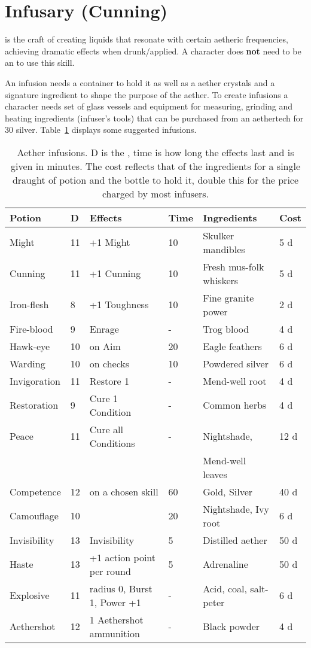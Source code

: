 \documentclass[a4paper,11pt,oneside]{book}
\newcommand{\textlf}[1]{\textbf{\titlecap{#1}}}
\begin{document}
\section{Infusary (Cunning)}
\label{sec:infuse}
\textlf{Infusary} is the craft of creating liquids that resonate with certain aetheric frequencies, achieving dramatic effects when drunk/applied. A character does \textbf{not} need to be an \textlf{aethermancer} to use this skill.

An infusion needs a container to hold it as well as a aether crystals and a signature ingredient to shape the purpose of the aether. To create infusions a character needs set of glass vessels and equipment for measuring, grinding and heating ingredients (infuser's tools) that can be purchased from an aethertech for 30 silver.
Table~\ref{tab:alch} displays some suggested infusions.

\begin{table}[ht!]
\caption{Aether infusions. D is the \textlf{difficulty}, time is how long the effects last and is given in minutes. The cost reflects that of the ingredients for a single draught of potion and the bottle to hold it, double this for the price charged by most infusers.}
\begin{tabular}{|l|l|l|l|l|l|}
\hline
Potion & D & Effects & Time & Ingredients & Cost \\
\hline
Might &  11 & +1 Might & 10 & Skulker mandibles & 5 d \\
Cunning & 11 & +1 Cunning & 10 & Fresh mus-folk whiskers & 5 d \\
Iron-flesh & 8 & +1 Toughness & 10 & Fine granite power & 2 d \\
Fire-blood & 9 & Enrage & - & Trog blood & 4 d \\
Hawk-eye & 10 & \textlf{edge+} on Aim & 20 & Eagle feathers & 6 d \\
Warding & 10 & \textlf{edge+} on \textlf{resist} checks & 10 & Powdered silver & 6 d \\ 
Invigoration & 11 & Restore 1 \textlf{endurance} & - & Mend-well root & 4 d \\
Restoration & 9 & Cure 1 Condition & - & Common herbs & 4 d \\
Peace & 11 & Cure all Conditions & - & Nightshade,  & 12 d \\
 & & & & Mend-well leaves & \\
Competence & 12 & \textlf{edge+} on a chosen skill & 60 & Gold, Silver & 40 d \\
Camouflage & 10 & \textlf{Stealth edge+} & 20 & Nightshade, Ivy root & 6 d \\
Invisibility & 13 & Invisibility & 5 & Distilled aether & 50 d \\
Haste & 13 & +1 action point per round & 5 & Adrenaline & 50 d \\ 
Explosive & 11 & radius 0, Burst 1, Power +1 & - & Acid, coal, salt-peter & 6 d \\
Aethershot & 12 & 1 Aethershot ammunition & - & Black powder & 4 d \\ 
\hline
\end{tabular}
\label{tab:alch}
\end{table}
\end{document}
